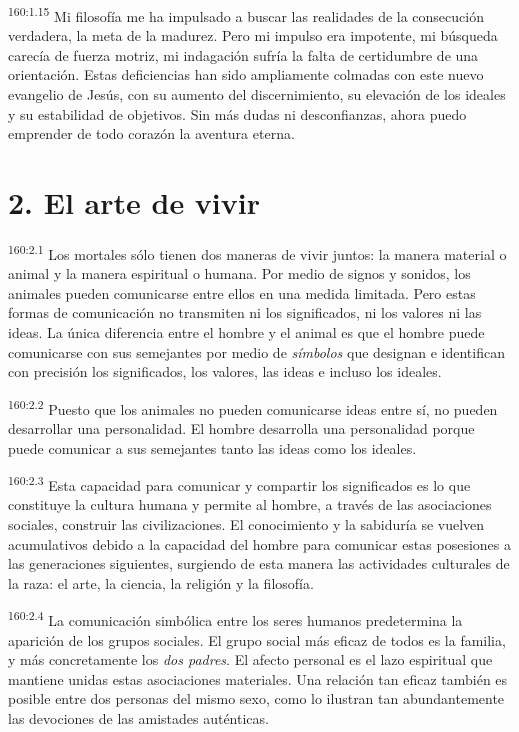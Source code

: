 \par 
\textsuperscript{160:1.15} Mi filosofía me ha impulsado a buscar las realidades de la consecución verdadera, la meta de la madurez. Pero mi impulso era impotente, mi búsqueda carecía de fuerza motriz, mi indagación sufría la falta de certidumbre de una orientación. Estas deficiencias han sido ampliamente colmadas con este nuevo evangelio de Jesús, con su aumento del discernimiento, su elevación de los ideales y su estabilidad de objetivos. Sin más dudas ni desconfianzas, ahora puedo emprender de todo corazón la aventura eterna.

\section*{2. El arte de vivir}
\par 
\textsuperscript{160:2.1} Los mortales sólo tienen dos maneras de vivir juntos: la manera material o animal y la manera espiritual o humana. Por medio de signos y sonidos, los animales pueden comunicarse entre ellos en una medida limitada. Pero estas formas de comunicación no transmiten ni los significados, ni los valores ni las ideas. La única diferencia entre el hombre y el animal es que el hombre puede comunicarse con sus semejantes por medio de \textit{símbolos} que designan e identifican con precisión los significados, los valores, las ideas e incluso los ideales.

\par 
\textsuperscript{160:2.2} Puesto que los animales no pueden comunicarse ideas entre sí, no pueden desarrollar una personalidad. El hombre desarrolla una personalidad porque puede comunicar a sus semejantes tanto las ideas como los ideales.

\par 
\textsuperscript{160:2.3} Esta capacidad para comunicar y compartir los significados es lo que constituye la cultura humana y permite al hombre, a través de las asociaciones sociales, construir las civilizaciones. El conocimiento y la sabiduría se vuelven acumulativos debido a la capacidad del hombre para comunicar estas posesiones a las generaciones siguientes, surgiendo de esta manera las actividades culturales de la raza: el arte, la ciencia, la religión y la filosofía.

\par 
\textsuperscript{160:2.4} La comunicación simbólica entre los seres humanos predetermina la aparición de los grupos sociales. El grupo social más eficaz de todos es la familia, y más concretamente los \textit{dos padres}. El afecto personal es el lazo espiritual que mantiene unidas estas asociaciones materiales. Una relación tan eficaz también es posible entre dos personas del mismo sexo, como lo ilustran tan abundantemente las devociones de las amistades auténticas.

